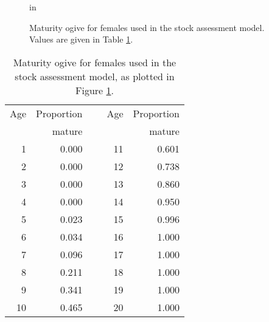 \begin{figure}[tp]
\begin{center}
{} in
\vspace{-8mm}
\end{center}
\caption{Maturity ogive for females used in the stock assessment model. Values are given in Table \ref{tab:maturity}.}
\label{fig:maturity} 
\end{figure}

\begin{table}[btp]
\begin{center}
\caption{Maturity ogive for females used in the stock assessment model, as plotted in Figure \ref{fig:maturity}.}
\label{tab:maturity}
\begin{tabular}{rrcrr}
  \hline
Age & Proportion & ~ & Age & Proportion\\ 
 & mature & & & mature \\
  \hline
1 & 0.000 & ~ & 11 & 0.601 \\ 
2 & 0.000 & ~ & 12 & 0.738 \\ 
3 & 0.000 & ~ & 13 & 0.860 \\ 
4 & 0.000 & ~ & 14 & 0.950 \\ 
5 & 0.023 & ~ & 15 & 0.996 \\ 
6 & 0.034 & ~ & 16 & 1.000 \\ 
7 & 0.096 & ~ & 17 & 1.000 \\ 
8 & 0.211 & ~ & 18 & 1.000 \\ 
9 & 0.341 & ~ & 19 & 1.000 \\ 
10 & 0.465 & ~ & 20 & 1.000 \\
\hline
\end{tabular}
\end{center}
\end{table}

\clearpage
